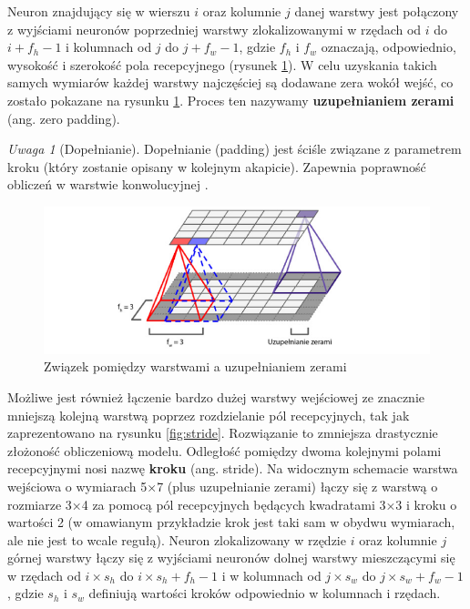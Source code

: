 \documentclass[12pt]{mwbk}
\theoremstyle{plain}
\theoremstyle{definition}
\theoremstyle{remark}
\newtheorem{uwaga}{Uwaga}[chapter]
\newcommand\zrodlo[1]{\par\vspace{-3mm}{\small\textit{Źródło: }#1 }}
\begin{document}
Neuron znajdujący się w wierszu $i$ oraz kolumnie $j$ danej warstwy jest połączony z wyjściami neuronów poprzedniej warstwy zlokalizowanymi w rzędach od $i$ do $i+f_h -1$ i kolumnach od $j$ do $j+f_w -1$,
gdzie $f_h$ i $f_w$ oznaczają, odpowiednio, wysokość i szerokość pola recepcyjnego (rysunek \ref{fig:zero-padding}). W celu
uzyskania takich samych wymiarów każdej warstwy najczęściej są dodawane zera wokół wejść, co zostało pokazane na rysunku \ref{fig:zero-padding}. Proces ten nazywamy \textbf{uzupełnianiem zerami} (ang. zero padding).

\begin{uwaga}[Dopełnianie]
	Dopełnianie (padding) jest ściśle związane z parametrem kroku (który zostanie opisany w kolejnym akapicie). Zapewnia poprawność obliczeń w warstwie konwolucyjnej \cite{illustrated}.
\end{uwaga}

\begin{figure}[!h]
	\centering
	\includegraphics[width=\linewidth]{rys/zero_padding.png}
	\caption{Związek pomiędzy warstwami a uzupełnianiem zerami}
	\zrodlo{\cite{geron}}
	\label{fig:zero-padding}
\end{figure}

Możliwe jest również łączenie bardzo dużej warstwy wejściowej ze znacznie mniejszą kolejną warstwą
poprzez rozdzielanie pól recepcyjnych, tak jak zaprezentowano na rysunku \ref{fig:stride}. Rozwiązanie to
zmniejsza drastycznie złożoność obliczeniową modelu. Odległość pomiędzy dwoma kolejnymi polami
recepcyjnymi nosi nazwę \textbf{kroku} (ang. stride). Na widocznym schemacie warstwa wejściowa o wymiarach 5×7 (plus uzupełnianie zerami) łączy się z warstwą o rozmiarze 3×4 za pomocą pól recepcyjnych będących kwadratami 3×3 i kroku o wartości 2 (w omawianym przykładzie krok jest taki sam w obydwu wymiarach, ale nie jest to wcale regułą). Neuron zlokalizowany w rzędzie $i$ oraz kolumnie $j$ górnej warstwy łączy się z wyjściami neuronów dolnej warstwy mieszczącymi się w rzędach od $i\times s_h$ do $i\times s_h +f_h -1$ i w kolumnach od $j\times s_w$ do $j \times s_w +f_w -1$, gdzie $s_h$ i $s_w$ definiują wartości kroków odpowiednio w kolumnach i rzędach.
\end{document}

